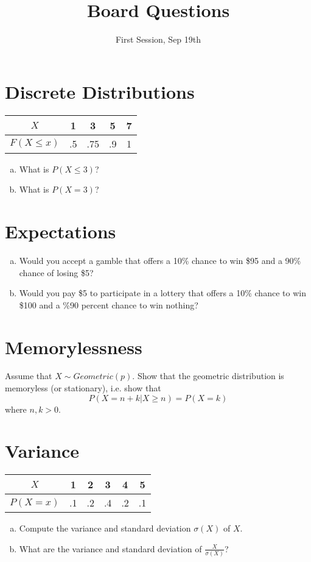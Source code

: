\documentclass[11p,a4paper]{article}
\title{Board Questions}
\date{First Session, Sep 19th}
\begin{document}
\maketitle

\section{Discrete Distributions}
\begin{table}[ht!]
\center
\begin{tabular}{|c||c|c|c|c|}
\hline
$X$ 				&	1	&	3	&	5	&	7	\\
\hline
$F(X \leq x)$	&	.5	&	.75	&	.9	&	1	\\
\hline
\end{tabular}
\end{table}
\begin{enumerate}[a)]
\item What is $ P(X \leq 3) $?
\item What is $ P(X = 3) $?
\end{enumerate}

\section{Expectations}
\begin{enumerate}[a)]
\item Would you accept a gamble that offers a 10\% chance to win \$95 and a 90\% chance of losing \$5?
\item Would you pay \$5 to participate in a lottery that offers a 10\% chance to win \$100 and a \%90
percent chance to win nothing?
\end{enumerate}

\section{Memorylessness}
Assume that $ X \sim Geometric(p) $. Show that the geometric distribution is memoryless (or stationary), i.e.
show that 
$$ P(X = n + k | X \geq n) = P(X = k) $$
where $ n,k > 0 $.

\section{Variance}
\begin{table}[ht!]
\center
\begin{tabular}{|c||c|c|c|c|c|}
\hline
$ X $		& 1	&	2	&	3	&	4	&	5	\\
\hline
$P(X = x)$	& .1 & .2	&	.4	&	.2	&	.1	\\
\hline 
\end{tabular}
\end{table}
\begin{enumerate}[a)]
\item Compute the variance and standard deviation $ \sigma(X) $ of $ X $.
\item What are the variance and standard deviation of $ \frac{X}{\sigma(X)} $?
\end{enumerate}
\end{document}
